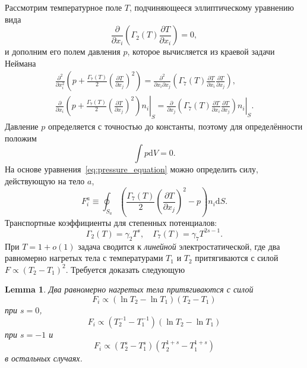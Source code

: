 \documentclass{article}
\theoremstyle{plain}
\newtheorem*{lemma}{Lemma}
\newcommand{\dd}{\mathrm{d}}
\newcommand{\pder}[2][]{\frac{\partial#1}{\partial#2}}
\newcommand{\pderdual}[2][]{\frac{\partial^2#1}{\partial#2^2}}
\newcommand{\pderder}[3][]{\frac{\partial^2#1}{\partial#2\partial#3}}
\newcommand{\eqdef}{\equiv}
\begin{document}
Рассмотрим температурное поле \(T\), подчиняющееся эллиптическому уравнению вида
\begin{equation}\label{eq:elliptic}
    \pder{x_i}\left( \Gamma_2(T) \pder[T]{x_i} \right) = 0,
\end{equation}
и дополним его полем давления \(p\), которое вычисляется из краевой задачи Неймана
\begin{gather}
    \pderdual{x_i}\left( p + \frac{\Gamma_7(T)}{2}\left(\pder[T]{x_j}\right)^2 \right) =
    \pderder{x_i}{x_j}\left( \Gamma_7(T)\pder[T]{x_i}\pder[T]{x_j} \right), \label{eq:pressure_equation}\\
    \pder{x_i}\left.\left( p + \frac{\Gamma_7(T)}{2}\left(\pder[T]{x_j}\right)^2 \right)n_i\right|_S =
    \pder{x_j}\left.\left( \Gamma_7(T)\pder[T]{x_i}\pder[T]{x_j} \right)n_i\right|_S. \label{eq:pressure_boundary}
\end{gather}
Давление \(p\) определяется с точностью до константы, поэтому для определённости положим
\begin{equation}\label{eq:pressure_integral}
    \int p\dd{V} = 0.
\end{equation}
На основе уравнения~\eqref{eq:pressure_equation} можно определить силу, действующую на тело \(a\),
\begin{equation}\label{eq:force_ell}
    F^a_i \eqdef \oint_{S_a} \left( \frac{\Gamma_7(T)}{2}\left(\pder[T]{x_j}\right)^2 - p \right) n_i\dd{S}.
\end{equation}
Транспортные коэффициенты для степенных потенциалов:
\begin{equation}\label{eq:gammas}
    \Gamma_2(T) = \gamma_2 T^s, \quad \Gamma_7(T) = \gamma_7 T^{2s-1}.
\end{equation}
При \(T=1+o(1)\) задача сводится к \emph{линейной} электростатической,
где два равномерно нагретых тела с температурами \(T_1\) и \(T_2\) притягиваются с силой \(F \propto (T_2-T_1)^2\).
Требуется доказать следующую
\begin{lemma}\label{lem:force}
    Два равномерно нагретых тела притягиваются с силой
    \begin{equation}\label{eq:force_temp_0}
        F_i \propto \left( \ln{T_2}-\ln{T_1} \right)\left( T_2 - T_1 \right)
    \end{equation}
    при \(s=0\),
    \begin{equation}\label{eq:force_temp_-1}
        F_i \propto \left( T_2^{-1} - T_1^{-1} \right)\left( \ln{T_2}-\ln{T_1} \right)
    \end{equation}
    при \(s=-1\) и
    \begin{equation}\label{eq:force_temp}
        F_i \propto \left( T_2^s - T_1^s \right)\left( T_2^{1+s} - T_1^{1+s} \right)
    \end{equation}
    в остальных случаях.
\end{lemma}
\end{document}
